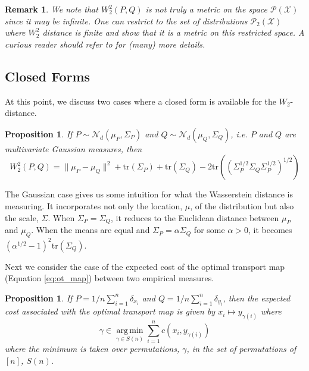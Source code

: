 \documentclass[11pt, a4paper, fleqn]{article}
\numberwithin{equation}{section}
\numberwithin{figure}{section}
\numberwithin{table}{section}
\newtheorem{prop}[thm]{Proposition}
\newtheorem{rem}[thm]{Remark}
\DeclareMathOperator*{\argmin}{arg\,min}
\begin{document}
\begin{rem}
We note that $W_2^2(P, Q)$ is not truly a metric on the space $\mathcal{P}(\mathcal{X})$ since it may be infinite. One can restrict to the set of distributions $\mathcal{P}_2(\mathcal{X})$ where $W_2^2$ distance is finite and show that it is a metric on this restricted space. A curious reader should refer to \cite{villani2008optimal} for (many) more details.
\end{rem}

\subsection{Closed Forms}
At this point, we discuss two cases where a closed form is available for the $W_2$-distance.

\begin{prop}
If $P \sim \mathcal{N}_d(\mu_P, \Sigma_P)$ and $Q \sim \mathcal{N}_d(\mu_Q, \Sigma_Q)$, i.e. $P$ and $Q$ are multivariate Gaussian measures, then
\begin{equation}\label{eq:gaussian_wass}
W_2^2(P, Q) = \|\mu_P - \mu_Q\|^2 + \mbox{tr}(\Sigma_P) + \mbox{tr}(\Sigma_Q) - 2\mbox{tr}((\Sigma_P^{1/2} \Sigma_Q \Sigma_P^{1/2})^{1/2})
\end{equation}
\end{prop}

The Gaussian case gives us some intuition for what the Wasserstein distance is measuring. It incorporates not only the location, $\mu$, of the distribution but also the scale, $\Sigma$. When $\Sigma_P = \Sigma_Q$, it reduces to the Euclidean distance between $\mu_P$ and $\mu_Q$. When the means are equal and $\Sigma_P = \alpha \Sigma_Q$ for some $\alpha > 0$, it becomes $(\alpha^{1/2} - 1)^2 \mbox{tr}(\Sigma_Q)$.

Next we consider the case of the expected cost of the optimal transport map (Equation \eqref{eq:ot_map}) between two empirical measures.

\begin{prop}\label{prop:ot_map_empirical}
If $P = 1/n \sum_{i=1}^n \delta_{x_i}$ and $Q = 1/n \sum_{i=1}^n \delta_{y_i}$, then the expected cost associated with the optimal transport map is given by $x_i \mapsto y_{\gamma(i)}$ where
\begin{equation}\label{eq:ot_map_empirical}
\gamma \in \argmin\limits_{\gamma \in S(n)} \sum\limits_{i=1}^n c(x_i, y_{\gamma(i)})
\end{equation}
where the minimum is taken over permutations, $\gamma$, in the set of permutations of $[n]$, $S(n)$.
\end{prop}
\end{document}
